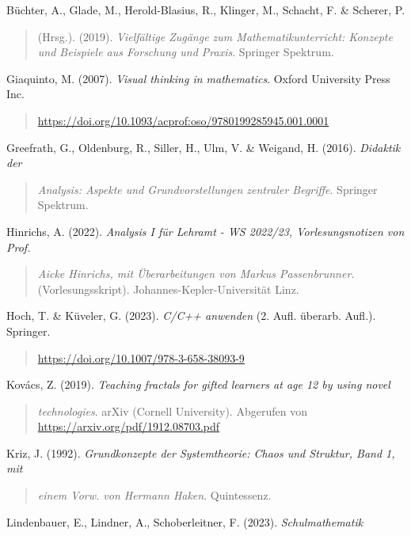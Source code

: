 \documentclass[a4paper, 12pt]{book}
\begin{document}
Büchter, A., Glade, M., Herold-Blasius, R., Klinger, M., Schacht, F. \&
Scherer, P.

\begin{quote}
(Hrsg.). (2019). \emph{Vielfältige Zugänge zum Mathematikunterricht:
Konzepte und Beispiele aus Forschung und Praxis}. Springer Spektrum.
\end{quote}

Giaquinto, M. (2007). \emph{Visual thinking in mathematics}. Oxford
University Press Inc.

\begin{quote}
\url{https://doi.org/10.1093/acprof:oso/9780199285945.001.0001}
\end{quote}

Greefrath, G., Oldenburg, R., Siller, H., Ulm, V. \& Weigand, H. (2016).
\emph{Didaktik der}

\begin{quote}
\emph{Analysis: Aspekte und Grundvorstellungen zentraler Begriffe}.
Springer Spektrum.
\end{quote}

Hinrichs, A. (2022). \emph{Analysis I für Lehramt - WS 2022/23,
Vorlesungsnotizen von Prof.}

\begin{quote}
\emph{Aicke Hinrichs, mit Überarbeitungen von Markus Passenbrunner.}
(Vorlesungsskript). Johannes-Kepler-Universität Linz.
\end{quote}

Hoch, T. \& Küveler, G. (2023). \emph{C/C++ anwenden} (2. Aufl. überarb.
Aufl.). Springer.

\begin{quote}
\url{https://doi.org/10.1007/978-3-658-38093-9}
\end{quote}

Kovács, Z. (2019). \emph{Teaching fractals for gifted learners at age 12
by using novel}

\begin{quote}
\emph{technologies}. arXiv (Cornell University). Abgerufen von
\url{https://arxiv.org/pdf/1912.08703.pdf}
\end{quote}

Kriz, J. (1992). \emph{Grundkonzepte der Systemtheorie: Chaos und
Struktur, Band 1, mit}

\begin{quote}
\emph{einem Vorw. von Hermann Haken}. Quintessenz.
\end{quote}

Lindenbauer, E., Lindner, A., Schoberleitner, F. (2023).
\emph{Schulmathematik}
\end{document}
